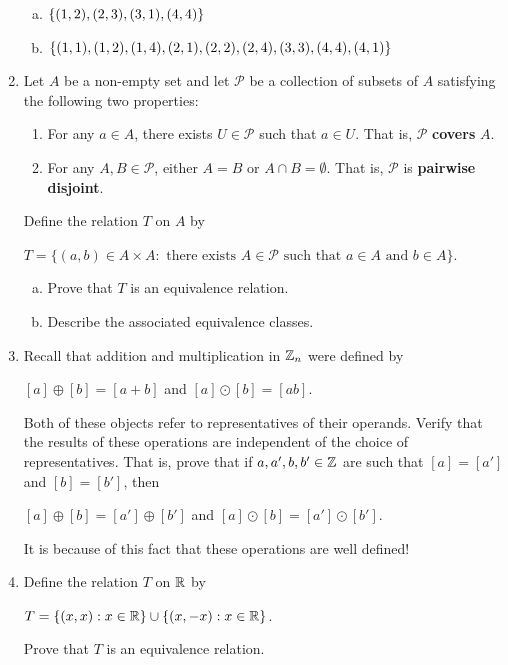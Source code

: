 \documentclass[11pt,fleqn,dvipsnames,usenames]{article}
\newcommand{\p}{\noindent}
\begin{document}
\begin{enumerate}
\begin{enumerate}[(a)]
\item $\left\{(1,2), (2,3), (3,1), (4,4)\right\}$
\item $\left\{(1,1), (1,2), (1,4), (2,1), (2,2), (2,4), (3,3), (4,4), (4,1)\right\}$
\end{enumerate}
\item Let $A$ be a non-empty set and let $\mathcal{P}$ be a collection of subsets of $A$ satisfying the following two properties:
\begin{enumerate}[(1)]
\item For any $a\in A$, there exists $U\in\mathcal{P}$ such that $a\in U$.  That is, $\mathcal{P}$ \textbf{covers} $A$.
\item For any $A,B\in\mathcal{P}$, either $A = B$ or $A\cap B = \emptyset$.  That is, $\mathcal{P}$ is \textbf{pairwise disjoint}.
\end{enumerate}
Define the relation $T$ on $A$ by
\begin{center}
$T = \big\{(a,b)\in A\times A:\text{ there exists }A\in\mathcal{P}\text{ such that }a\in A\text{ and }b\in A\big\}$.
\end{center}
\begin{enumerate}[(a)]
\item Prove that $T$ is an equivalence relation.
\item Describe the associated equivalence classes.
\end{enumerate}
\item Recall that addition and multiplication in $\mathbb{Z}_n$ were defined by
\begin{center}
$[a] \oplus [b] = [a + b]$ and $[a]\odot [b] = [ab]$.
\end{center}
\p Both of these objects refer to representatives of their operands.  Verify that the results of these operations are independent of the choice of representatives.  That is, prove that if $a,a',b,b'\in\mathbb{Z}$ are such that $[a] = [a']$ and $[b] = [b']$, then
\begin{center}
$[a]\oplus [b] = [a']\oplus [b']$ and $[a]\odot [b] = [a']\odot [b']$.
\end{center}

\note It is because of this fact that these operations are well defined!

\item Define the relation $T$ on $\mathbb{R}$ by
\begin{center}
$T = \left\{(x,x): x\in\mathbb{R}\right\}\cup \left\{(x,-x): x\in\mathbb{R}\right\}$.
\end{center}
Prove that $T$ is an equivalence relation.


\end{enumerate}
\end{document}
